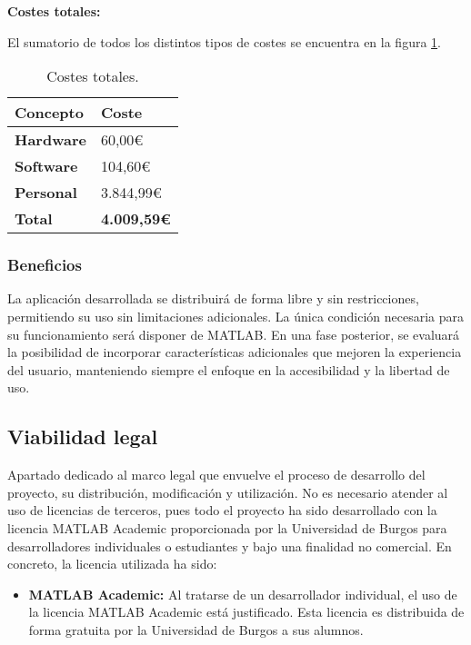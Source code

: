 \textbf{Costes totales:}

El sumatorio de todos los distintos tipos de costes se encuentra en la figura \ref{tabla:costes-de-totales}.

\begin{table}[h!]
    \centering
    \begin{tabular}{l l}
        \hline
        \textbf{Concepto}   & \textbf{Coste}        \\
        \hline
        \textbf{Hardware}   & 60,00€                \\
        \textbf{Software}   & 104,60€               \\
        \textbf{Personal}   & 3.844,99€             \\
        \hline
        \textbf{Total}      & \textbf{4.009,59€}    \\
        \hline
    \end{tabular}
    \caption{Costes totales.}\label{tabla:costes-de-totales}
\end{table}

\subsubsection{Beneficios}\label{beneficios}

La aplicación desarrollada se distribuirá de forma libre y sin restricciones, permitiendo su uso sin limitaciones adicionales. La única condición necesaria para su funcionamiento será disponer de MATLAB. En una fase posterior, se evaluará la posibilidad de incorporar características adicionales que mejoren la experiencia del usuario, manteniendo siempre el enfoque en la accesibilidad y la libertad de uso.

\subsection{Viabilidad legal}\label{viabilidad-legal}

Apartado dedicado al marco legal que envuelve el proceso de desarrollo del proyecto, su distribución, modificación y utilización. No es necesario atender al uso de licencias de terceros, pues todo el proyecto ha sido desarrollado con la licencia MATLAB Academic proporcionada por la Universidad de Burgos para desarrolladores individuales o estudiantes y bajo una finalidad no comercial. En concreto, la licencia utilizada ha sido:

\begin{itemize}
  \item \textbf{MATLAB Academic:} Al tratarse de un desarrollador individual, el uso de la licencia MATLAB Academic está justificado. Esta licencia es distribuida de forma gratuita por la Universidad de Burgos a sus alumnos.
\end{itemize}

